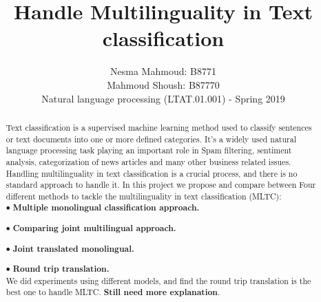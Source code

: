 \documentclass[letterpaper,12pt]{article}
\begin{document}
\title{Handle Multilinguality in Text classification}

\author{Nesma Mahmoud: B8771\\ Mahmoud Shoush: B87770\\ [1cm]{\small Natural language processing (LTAT.01.001) - Spring 2019}}

\date{\vspace{-5ex}}
\maketitle


\vspace{30 mm}
\begin{abstract}
Text classification is a supervised machine learning method used to classify sentences or text documents into one or more defined categories. It’s a widely used natural language processing task playing an important role in Spam filtering, sentiment analysis, categorization of news articles and many other business related issues. Handling multilinguality in text classification is a crucial process, and there is no standard approach to handle it. In this project we propose and compare between Four different methods to tackle the multilinguality in text classification (MLTC): \\

$\bullet$ \textbf{Multiple monolingual classification approach.}

$\bullet$ \textbf{Comparing joint multilingual approach.}

$\bullet$ \textbf{Joint translated monolingual.}

$\bullet$ \textbf{Round trip translation.}\\

We did experiments using different models, and find the round trip translation is the best one to handle MLTC. \textbf{Still need more explanation}.


\end{abstract}
\end{document}
